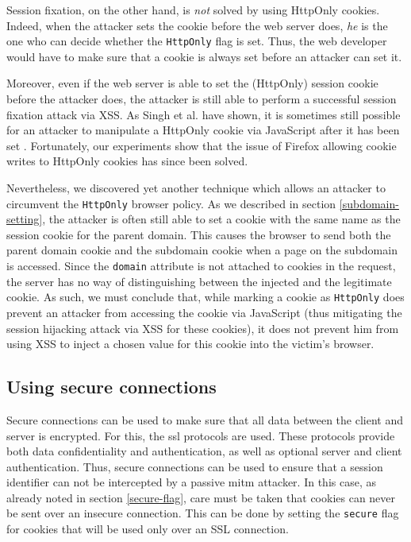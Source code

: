 Session fixation, on the other hand, is \emph{not} solved by using HttpOnly cookies. Indeed, when the attacker sets the cookie before the web server does, \emph{he} is the one who can decide whether the \texttt{HttpOnly} flag is set. Thus, the web developer would have to make sure that a cookie is always set before an attacker can set it.

Moreover, even if the web server is able to set the (HttpOnly) session cookie before the attacker does, the attacker is still able to perform a successful session fixation attack via XSS. As Singh et al. have shown, it is sometimes still possible for an attacker to manipulate a HttpOnly cookie via JavaScript after it has been set \cite{Singh2010}. Fortunately, our experiments show that the issue of Firefox allowing cookie writes to HttpOnly cookies has since been solved.

Nevertheless, we discovered yet another technique which allows an attacker to circumvent the \texttt{HttpOnly} browser policy. As we described in section \ref{subdomain-setting}, the attacker is often still able to set a cookie with the same name as the session cookie for the parent domain. This causes the browser to send both the parent domain cookie and the subdomain cookie when a page on the subdomain is accessed. Since the \texttt{domain} attribute is not attached to cookies in the request, the server has no way of distinguishing between the injected and the legitimate cookie. As such, we must conclude that, while marking a cookie as \texttt{HttpOnly} does prevent an attacker from accessing the cookie via JavaScript (thus mitigating the session hijacking attack via XSS for these cookies), it does not prevent him from using XSS to inject a chosen value for this cookie into the victim's browser.

\subsection{Using secure connections}\label{ssl}

Secure connections \cite{Stallings2011} can be used to make sure that all data between the client and server is encrypted. For this, the \gls{ssl} protocols are used. These protocols provide both data confidentiality and authentication, as well as optional server and client authentication. Thus, secure connections can be used to ensure that a session identifier can not be intercepted by a passive \gls{mitm} attacker. In this case, as already noted in section \ref{secure-flag}, care must be taken that cookies can never be sent over an insecure connection. This can be done by setting the \texttt{secure} flag for cookies that will be used only over an SSL connection.

